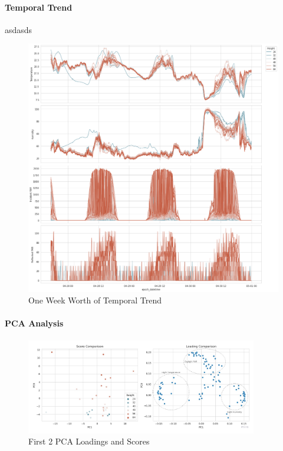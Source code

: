 \documentclass[11pt, letterpaper]{article}
\begin{document}
\paragraph{Temporal Trend}
asdasds
\begin{figure}[h!]
\centering
\includegraphics[width=1.0\textwidth]{eda_3.4.png}
\captionsetup{justification=centering}
\caption{One Week Worth of Temporal Trend}
\label{fig:ts_trend}
\end{figure}


\paragraph{PCA Analysis}
\begin{figure}[h!]
\centering
\includegraphics[width=0.9\textwidth]{eda_3.6.jpg}
\captionsetup{justification=centering}
\caption{First 2 PCA Loadings and Scores}
\label{fig:pca}
\end{figure}
\end{document}
